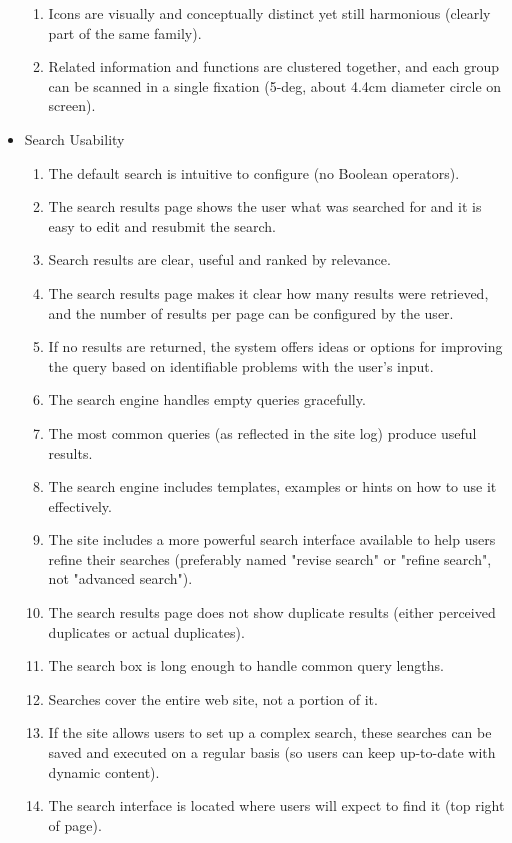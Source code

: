 \begin{itemize}
\begin{enumerate}
        \item Icons are visually and conceptually distinct yet still harmonious (clearly part of the same family).
        \item Related information and functions are clustered together, and each group can be scanned in a single fixation (5-deg, about 4.4cm diameter circle on screen).
      \end{enumerate}
  \item Search Usability
      \begin{enumerate}
        \item The default search is intuitive to configure (no Boolean operators).
        \item The search results page shows the user what was searched for and it is easy to edit and resubmit the search.
        \item Search results are clear, useful and ranked by relevance.
        \item The search results page makes it clear how many results were retrieved, and the number of results per page can be configured by the user.
        \item If no results are returned, the system offers ideas or options for improving the query based on identifiable problems with the user's input.
        \item The search engine handles empty queries gracefully.
        \item The most common queries (as reflected in the site log) produce useful results.
        \item The search engine includes templates, examples or hints on how to use it effectively.
        \item The site includes a more powerful search interface available to help users refine their searches (preferably named "revise search" or "refine search", not "advanced search").
        \item The search results page does not show duplicate results (either perceived duplicates or actual duplicates).
        \item The search box is long enough to handle common query lengths.
        \item Searches cover the entire web site, not a portion of it.
        \item If the site allows users to set up a complex search, these searches can be saved and executed on a regular basis (so users can keep up-to-date with dynamic content).
        \item The search interface is located where users will expect to find it (top right of page).

\end{enumerate}
\end{itemize}
